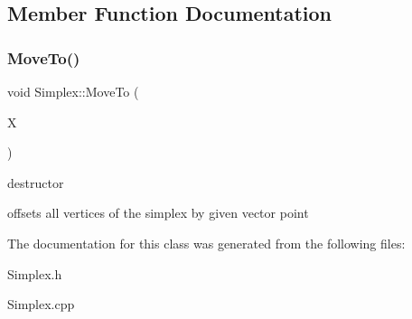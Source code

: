 \subsection{Member Function Documentation}
\mbox{\label{class_simplex_a78284170bf58df27fcd5a8df6de283f3}} 
\subsubsection{\texorpdfstring{Move\+To()}{MoveTo()}}
{\footnotesize\ttfamily void Simplex\+::\+Move\+To (\begin{DoxyParamCaption}\item[{const \hyperlink{classv_point}{v\+Point} \&}]{X }\end{DoxyParamCaption})}



destructor 

offsets all vertices of the simplex by given vector point 

The documentation for this class was generated from the following files\+:\begin{DoxyCompactItemize}
\item 
Simplex.\+h\item 
Simplex.\+cpp\end{DoxyCompactItemize}
